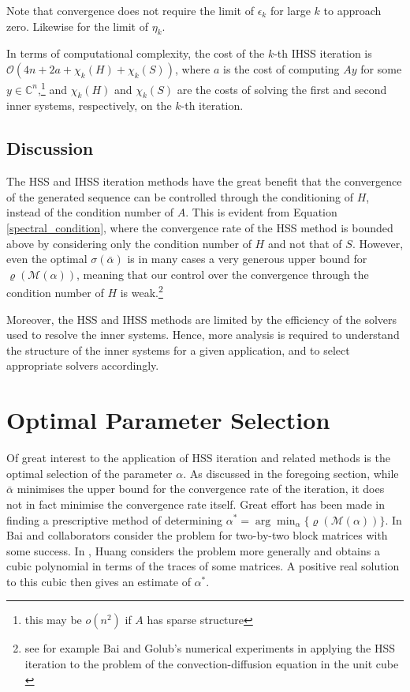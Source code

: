 \documentclass{article}
\newcommand{\bC}{\mathds{C}}
\begin{document}
Note that convergence does not require the limit of $\epsilon_k$ for large $k$ to approach zero. Likewise for the limit of $\eta_k$.

In terms of computational complexity, the cost of the $k$-th IHSS iteration is $\mathcal{O}(4n + 2a + \chi_k(H)+\chi_k(S))$, where $a$ is the cost of computing $Ay$ for some $y\in \bC^n$,\footnote{this may be $o(n^2)$ if $A$ has sparse structure} and $\chi_k(H)$ and $\chi_k(S)$ are the costs of solving the first and second inner systems, respectively, on the $k$-th iteration.
\subsection{Discussion}

The HSS and IHSS iteration methods have the great benefit that the convergence of the generated sequence can be controlled through the conditioning of $H$, instead of the condition number of $A$. This is evident from Equation \ref{spectral_condition}, where the convergence rate of the HSS method is bounded above by considering only the condition number of $H$ and not that of $S$.  However, even the optimal $\sigma(\bar{\alpha})$ is in many cases a very generous upper bound for $\varrho(\mathcal{M}(\alpha))$, meaning that our control over the convergence through the condition number of $H$ is weak.\footnote{see for example Bai and Golub's numerical experiments in applying the HSS iteration to the problem of the convection-diffusion equation in the unit cube \cite{bai2003hermitian}}

Moreover, the HSS and IHSS methods are limited by the efficiency of the solvers used to resolve the inner systems. Hence, more analysis is required to understand the structure of the inner systems for a given application, and to select appropriate solvers accordingly.


\section{Optimal Parameter Selection}

Of great interest to the application of HSS iteration and related methods is the optimal selection of the parameter $\alpha$. As discussed in the foregoing section, while $\bar{\alpha}$ minimises the upper bound for the convergence rate of the iteration, it does not in fact minimise the convergence rate itself. Great effort has been made in finding a prescriptive method of determining $\alpha^\ast = \arg \min_\alpha \{ \varrho(\mathcal{M}(\alpha))\}$. In \cite{two_two_block_optimal} Bai and collaborators consider the problem for two-by-two block matrices with some success. In \cite{HUANG2014142}, Huang considers the problem more generally and obtains a cubic polynomial in terms of the traces of some matrices. A positive real solution to this cubic then gives an estimate of $\alpha^\ast$.
\end{document}
